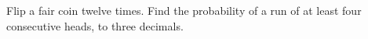 Flip a fair coin twelve times. Find the probability of a run of at least four consecutive heads, to three decimals.
